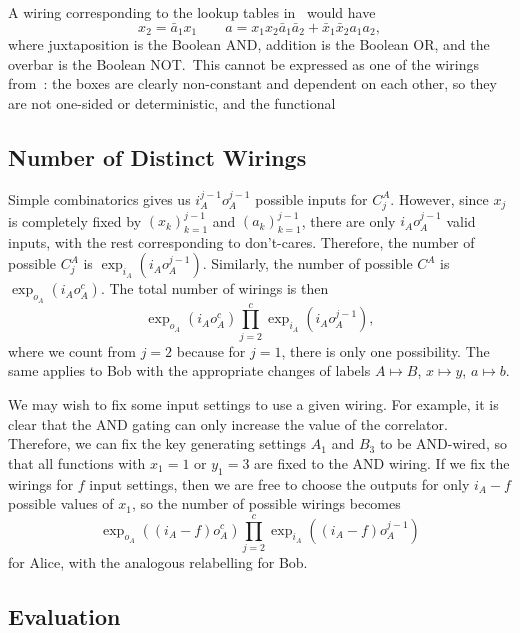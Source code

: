 \documentclass[10pt, a4paper]{article}
\newcommand{\?}{\mathrel{?}} %
\numberwithin{equation}{section} %
\theoremstyle{definition}
\theoremstyle{plain}
\theoremstyle{plain}
\begin{document}
    A wiring corresponding to the lookup tables in~ would have
    \begin{equation}
      x_2 = \bar{a}_1x_1 \qquad a = x_1x_2\bar{a}_1\bar{a}_2 + \bar{x}_1\bar{x}_2a_1a_2,
    \end{equation}
    where juxtaposition is the Boolean AND, addition is the Boolean OR, and the overbar is the Boolean NOT.\ This cannot be expressed as one of the wirings from~\cite{ShortEntangleSwap}: the boxes are clearly non-constant and dependent on each other, so they are not one-sided or deterministic, and the functional 

    \subsection{Number of Distinct Wirings}

    Simple combinatorics gives us \(i_A^{j-1} o_A^{j-1}\) possible inputs for \(C_j^A\). However, since \(x_j\) is completely fixed by \({(x_k)}_{k=1}^{j-1}\) and \({(a_k)}_{k=1}^{j-1}\), there are only \(i_A o_A^{j-1}\) valid inputs, with the rest corresponding to don't-cares. Therefore, the number of possible \(C_j^A\) is \(\exp_{i_A}(i_A o_A^{j-1})\). Similarly, the number of possible \(C^A\) is \(\exp_{o_A}(i_A o_A^{c})\). The total number of wirings is then
    \begin{equation}
      \exp_{o_A}(i_A o_A^c) \prod_{j=2}^c \exp_{i_A}(i_A o_A^{j-1}),
    \end{equation}
    where we count from \(j = 2\) because for \(j = 1\), there is only one possibility. The same applies to Bob with the appropriate changes of labels \(A \mapsto B\), \(x \mapsto y\), \(a \mapsto b\). 

    We may wish to fix some input settings to use a given wiring. For example, it is clear that the AND gating can only increase the value of the correlator. Therefore, we can fix the key generating settings \(A_1\) and \(B_3\) to be AND-wired, so that all functions with \(x_1 = 1\) or \(y_1 = 3\) are fixed to the AND wiring. If we fix the wirings for \(f\) input settings, then we are free to choose the outputs for only \(i_A - f\) possible values of \(x_1\), so the number of possible wirings becomes
    \begin{equation}
      \exp_{o_A}((i_A-f) o_A^c) \prod_{j=2}^c \exp_{i_A}((i_A-f) o_A^{j-1})
    \end{equation}
    for Alice, with the analogous relabelling for Bob.

    \subsection{Evaluation}
\end{document}
